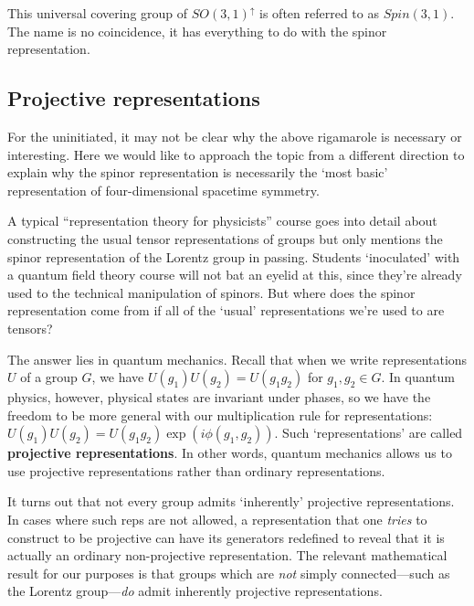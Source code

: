 \documentclass[12pt]{article}
\numberwithin{equation}{section}    %
\begin{document}
This universal covering group of $SO(3,1)^\uparrow$ is often referred to as $Spin(3,1)$. The name is no coincidence, it has everything to do with the spinor representation.

\subsection{Projective representations}\label{sec:SUSYalg:projective}

For the uninitiated, it may not be clear why the above rigamarole is necessary or  interesting. Here we would like to approach the topic from a different direction to explain why the spinor representation is necessarily the `most basic' representation of four-dimensional spacetime symmetry.
	
A typical ``representation theory for physicists'' course goes into detail about constructing the usual tensor representations of groups but only mentions the spinor representation of the Lorentz group in passing. Students `inoculated' with a quantum field theory course will not bat an eyelid at this, since they're already used to the technical manipulation of spinors. But where does the spinor representation come from if all of the `usual' representations we're used to are tensors?
	
 The answer lies in quantum mechanics. Recall that when we write representations $U$ of a group $G$, we have $U(g_1)U(g_2) = U(g_1g_2)$ for $g_1, g_2 \in G$. In quantum physics, however, physical states are invariant under phases, so we have the freedom to be more general with our multiplication rule for representations: $U(g_1)U(g_2) = U(g_1g_2)\exp({i\phi(g_1,g_2)})$. Such `representations' are called \textbf{projective representations}. In other words, quantum mechanics allows us to use projective representations rather than ordinary representations. 
	
It turns out that not every group admits `inherently' projective representations. In cases where such reps are not allowed, a representation that one \textit{tries} to construct to be projective can have its generators redefined to reveal that it is actually an ordinary non-projective representation. The relevant mathematical result for our purposes is that groups which are \textit{not} simply connected---such as the Lorentz group---\textit{do} admit inherently projective representations. 
	
\end{document}
